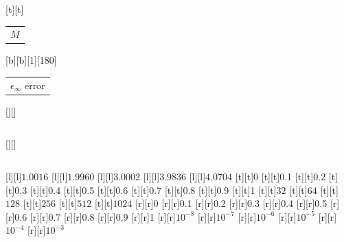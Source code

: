 %    
%
%
\begin{psfrags}%
\psfragscanon%
%
[t][t]{\color[rgb]{0,0,0}\setlength{\tabcolsep}{0pt}\begin{tabular}{c}$M$\end{tabular}}%
[b][b][1][180]{\color[rgb]{0,0,0}\setlength{\tabcolsep}{0pt}\begin{tabular}{c}$\epsilon_{\infty}$
error\end{tabular}}%
[][]{\color[rgb]{0,0,0}\setlength{\tabcolsep}{0pt}\begin{tabular}{c} \end{tabular}}%
[][]{\color[rgb]{0,0,0}\setlength{\tabcolsep}{0pt}\begin{tabular}{c} \end{tabular}}%
%
[l][l]{\color[rgb]{0,0,0}$1.0016$}%
[l][l]{\color[rgb]{0,0,0}$1.9960$}%
[l][l]{\color[rgb]{0,0,0}$3.0002$}%
[l][l]{\color[rgb]{0,0,0}$3.9836$}%
[l][l]{\color[rgb]{0,0,0}$4.0704$}%
%
%
[t][t]{0}%
[t][t]{0.1}%
[t][t]{0.2}%
[t][t]{0.3}%
[t][t]{0.4}%
[t][t]{0.5}%
[t][t]{0.6}%
[t][t]{0.7}%
[t][t]{0.8}%
[t][t]{0.9}%
[t][t]{1}%
[t][t]{${32}$}%
[t][t]{${64}$}%
[t][t]{${128}$}%
[t][t]{${256}$}%
[t][t]{${512}$}%
[t][t]{${1024}$}%
%
[r][r]{0}%
[r][r]{0.1}%
[r][r]{0.2}%
[r][r]{0.3}%
[r][r]{0.4}%
[r][r]{0.5}%
[r][r]{0.6}%
[r][r]{0.7}%
[r][r]{0.8}%
[r][r]{0.9}%
[r][r]{1}%
[r][r]{$10^{-8}$}%
[r][r]{$10^{-7}$}%
[r][r]{$10^{-6}$}%
[r][r]{$10^{-5}$}%
[r][r]{$10^{-4}$}%
[r][r]{$10^{-3}$}%

\end{psfrags}
